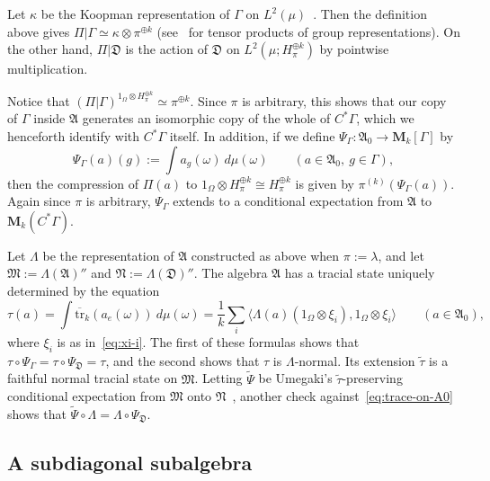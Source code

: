 \documentclass[12pt,a4paper]{article}
\numberwithin{equation}{section}
\theoremstyle{remark}
\newcommand{\rmM}{\mathbf{M}}
\newcommand{\A}{\mathfrak{A}}
\newcommand{\frD}{\mathfrak{D}}
\newcommand{\M}{\mathfrak{M}}
\newcommand{\N}{\mathfrak{N}}
\newcommand{\G}{\Gamma}
\renewcommand{\L}{\Lambda}
\renewcommand{\l}{\lambda}
\renewcommand{\t}[1]{\widetilde{#1}}
\newcommand{\tr}{\overline{\mathrm{tr}}}
\begin{document}
Let $\kappa$ be the Koopman representation of $\G$ on $L^2(\mu)$~\cite[Sec. II.10]{KecGAEGA}.  Then the definition above gives $\Pi|\G \simeq \kappa \otimes \pi^{\oplus k}$ (see~\cite[Sec. 13.1]{Dix--Cstar} for tensor products of group representations).  On the other hand, $\Pi|\frD$ is the action of $\frD$ on $L^2(\mu;H_\pi^{\oplus k})$ by pointwise multiplication.

Notice that $(\Pi|\G)^{1_\Omega \otimes H_\pi^{\oplus k}} \simeq \pi^{\oplus k}$.  Since $\pi$ is arbitrary, this shows that our copy of $\G$ inside $\A$ generates an isomorphic copy of the whole of $C^\ast \G$, which we henceforth identify with $C^\ast \G$ itself.  In addition, if we define $\Psi_\G:\A_0 \to \rmM_k[\G]$ by
\begin{equation}\label{eq:CE2}
\Psi_\G(a)(g) := \int a_g(\omega)\ d\mu(\omega) \qquad (a \in \A_0,\ g \in \G),
\end{equation}
then the compression of $\Pi(a)$ to $1_\Omega \otimes H_\pi^{\oplus k} \cong H_\pi^{\oplus k}$ is given by $\pi^{(k)}(\Psi_\G(a))$.  Again since $\pi$ is arbitrary, $\Psi_\G$ extends to a conditional expectation from $\A$ to $\rmM_k(C^\ast \G)$.

Let $\L$ be the representation of $\A$ constructed as above when $\pi := \l$, and let ${\M := \L(\A)''}$ and $\N := \L(\frD)''$.  The algebra $\A$ has a tracial state uniquely determined by the equation
\begin{equation}\label{eq:trace-on-A0}
\tau(a) = \int \tr_k(a_e(\omega))\ d\mu(\omega) = \frac{1}{k}\sum_i \langle \L(a)(1_\Omega\otimes \xi_i),1_\Omega\otimes \xi_i\rangle \qquad (a \in \A_0),
\end{equation}
where $\xi_i$ is as in~\eqref{eq:xi-i}.  The first of these formulas shows that $\tau\circ \Psi_\G = \tau \circ \Psi_\frD = \tau$, and the second shows that $\tau$ is $\L$-normal.  Its extension $\t{\tau}$ is a faithful normal tracial state on $\M$.  Letting $\t{\Psi}$ be Umegaki's $\t{\tau}$-preserving conditional expectation from $\M$ onto $\N$~\cite[Lem. 1.5.11]{BroOza08}, another check against~\eqref{eq:trace-on-A0} shows that $\t{\Psi}\circ \L = \L\circ  \Psi_\frD$. 





\subsection{A subdiagonal subalgebra}
\end{document}
